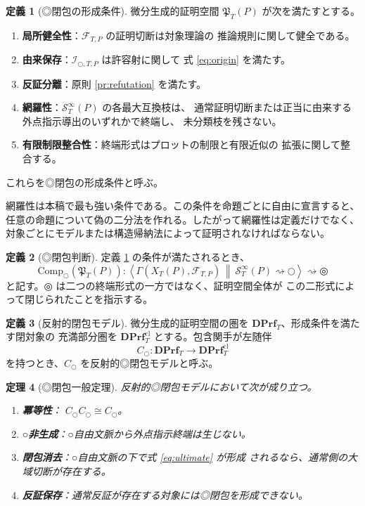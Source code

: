 \documentclass[a4paper,11pt]{ltjsarticle}
\theoremstyle{definition}
\newtheorem{definition}{定義}[section]
\theoremstyle{plain}
\newtheorem{theorem}[definition]{定理}
\newcommand{\dfix}{\mathord{\text{○}}}
\newcommand{\udfix}{\mathord{\text{◎}}}
\newcommand{\Comp}{\mathrm{Comp}_{\dfix}}
\newcommand{\1}{\mathbf{1}}
\begin{document}
\begin{definition}[◎閉包の形成条件]\label{def:formation}
微分生成的証明空間 $\mathfrak P_T(P)$ が次を満たすとする。
\begin{enumerate}
 \item \textbf{局所健全性}：$\mathcal F_{T,P}$ の証明切断は対象理論の
       推論規則に関して健全である。
 \item \textbf{由来保存}：$\mathcal I_{\dfix,T,P}$ は許容射に関して
       式 \eqref{eq:origin} を満たす。
 \item \textbf{反証分離}：原則 \ref{pr:refutation} を満たす。
 \item \textbf{網羅性}：$\mathcal S_T^\infty(P)$ の各最大互換枝は、
       通常証明切断または正当に由来する外点指示導出のいずれかで終端し、
       未分類枝を残さない。
 \item \textbf{有限制限整合性}：終端形式はプロットの制限と有限近似の
       拡張に関して整合する。
\end{enumerate}
これらを◎閉包の形成条件と呼ぶ。
\end{definition}

網羅性は本稿で最も強い条件である。この条件を命題ごとに自由に宣言すると、
任意の命題について偽の二分法を作れる。したがって網羅性は定義だけでなく、
対象ごとにモデルまたは構造帰納法によって証明されなければならない。

\begin{definition}[◎閉包判断]
定義 \ref{def:formation} の条件が満たされるとき、
\begin{equation}\label{eq:ultimate}
 \Comp(\mathfrak P_T(P)):
 \left\langle
  \Gamma(X_T(P),\mathcal F_{T,P})
  \ \middle\Vert\
  \mathcal S_T^\infty(P)\rightsquigarrow\dfix
 \right\rangle
 \rightsquigarrow\udfix
\end{equation}
と記す。$\udfix$ は二つの終端形式の一方ではなく、証明空間全体が
この二形式によって閉じられたことを指示する。
\end{definition}

\begin{definition}[反射的閉包モデル]
微分生成的証明空間の圏を $\mathbf{DPrf}_T$、形成条件を満たす閉対象の
充満部分圏を $\mathbf{DPrf}^{\mathrm{cl}}_T$ とする。包含関手が左随伴
\[
 C_{\dfix}:\mathbf{DPrf}_T\longrightarrow
 \mathbf{DPrf}^{\mathrm{cl}}_T
\]
を持つとき、$C_{\dfix}$ を反射的◎閉包モデルと呼ぶ。
\end{definition}

\begin{theorem}[◎閉包一般定理]\label{thm:general-closure}
反射的◎閉包モデルにおいて次が成り立つ。
\begin{enumerate}
 \item \textbf{冪等性}：
       $C_{\dfix}C_{\dfix}\cong C_{\dfix}$。
 \item \textbf{○非生成}：○自由文脈から外点指示終端は生じない。
 \item \textbf{閉包消去}：○自由文脈の下で式 \eqref{eq:ultimate} が形成
       されるなら、通常側の大域切断が存在する。
 \item \textbf{反証保存}：通常反証が存在する対象には◎閉包を形成できない。
\end{enumerate}
\end{theorem}
\end{document}
